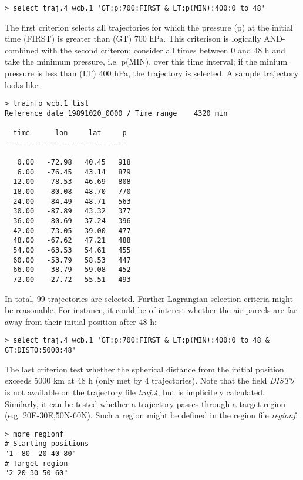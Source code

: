 \documentclass[a4paper,10pt]{article}
\begin{document}
\begin{verbatim}
> select traj.4 wcb.1 'GT:p:700:FIRST & LT:p(MIN):400:0 to 48'
\end{verbatim}

\noindent
The first criterion selects all trajectories for which the pressure (p) at the initial time (FIRST) is greater than (GT) 700 hPa. This criterison is logically AND-combined with the second criteron: consider all times between 0 and 48 h and take the minimum pressure, i.e. p(MIN), over this time interval; if the minium pressure is less than (LT) 400 hPa, the trajectory is selected. A sample trajectory looks like:

\begin{verbatim}
> trainfo wcb.1 list 
Reference date 19891020_0000 / Time range    4320 min

  time      lon     lat     p
-----------------------------

   0.00   -72.98   40.45   918
   6.00   -76.45   43.14   879
  12.00   -78.53   46.69   808
  18.00   -80.08   48.70   770
  24.00   -84.49   48.71   563
  30.00   -87.89   43.32   377
  36.00   -80.69   37.24   396
  42.00   -73.05   39.00   477
  48.00   -67.62   47.21   488
  54.00   -63.53   54.61   455
  60.00   -53.79   58.53   447
  66.00   -38.79   59.08   452
  72.00   -27.72   55.51   493
\end{verbatim}

\noindent
In total, 99 trajectories are selected. Further Lagrangian selection criteria might be reasonable. For instance, it could be of interest whether the air parcels are far away from their initial position after 48 h:

\begin{verbatim}
> select traj.4 wcb.1 'GT:p:700:FIRST & LT:p(MIN):400:0 to 48 & GT:DIST0:5000:48'
\end{verbatim}

\noindent
The last criterion test whether the spherical distance from the initial position exceeds 5000 km at 48 h (only met by 4 trajectories). Note that the field {\em DIST0} is not available on the trajectory file {\em traj.4}, but is implicitely calculated. \\

\noindent
Similarly, it can be tested whether a trajectory passes through a target region (e.g. 20E-30E,50N-60N). Such a region might be defined in the region file {\em regionf}:

\begin{verbatim}
> more regionf 
# Starting positions
"1 -80  20 40 80"
# Target region
"2 20 30 50 60"
\end{verbatim}
\end{document}
